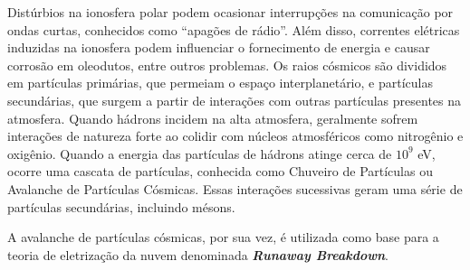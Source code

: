 \documentclass[a4paper, 12pt, onecolumn,singlespacing]{article}
\begin{document}
\begin{itemize}
		Distúrbios na ionosfera polar podem ocasionar interrupções na comunicação por ondas curtas, conhecidos como “apagões de rádio”. Além disso, correntes elétricas induzidas na ionosfera podem influenciar o fornecimento de energia e causar corrosão em oleodutos, entre outros problemas. Os raios cósmicos são divididos em partículas primárias, que permeiam o espaço interplanetário, e partículas secundárias, que surgem a partir de interações com outras partículas presentes na atmosfera. Quando hádrons incidem na alta atmosfera, geralmente sofrem interações de natureza forte ao colidir com núcleos atmosféricos como nitrogênio e oxigênio. Quando a energia das partículas de hádrons atinge cerca de $10^9$ eV, ocorre uma cascata de partículas, conhecida como Chuveiro de Partículas ou Avalanche de Partículas Cósmicas. Essas interações sucessivas geram uma série de partículas secundárias, incluindo mésons.
		
		A avalanche de partículas cósmicas, por sua vez, é utilizada como base para a teoria de eletrização da nuvem denominada \textbf{\textit{Runaway Breakdown}}.

	\end{itemize}
	
\end{document}
